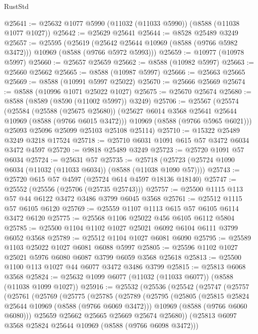\begin{lexlean}{RustStd}
\begin{coremodule}
@25641 := @25632 @1077 @5990 (@11032 (@11033 @5990)) (@8588 (@11038 @1077 @1027))
@25642 := @25629 @25641
@25644 := @8528 @25489 @3249
@25657 := @25595
    (@25619 (@25642 @25644 @10969 (@8588 (@9766 @5982 @3472))) @10969 (@8588 (@9766 @5972 @5993)))
@25659 := @10977 (@10978 @5997)
@25660 := @25657 @25659
@25662 := @8588 (@10982 @5997)
@25663 := @25660 @25662
@25665 := @8588 (@10987 @5997)
@25666 := @25663 @25665
@25669 := @8588 (@10991 @5997 @25022)
@25670 := @25666 @25669
@25674 := @8588 (@10996 @1071 @25022 @1027)
@25675 := @25670 @25674
@25680 := @8588 (@8589 (@8590 (@11002 @5997)) @3249)
@25706 := @25567
    (@25574
      (@25584
        (@25588 (@25675 @25680))
        (@25627 @6014 @3568 @25641 @25644 @10969 (@8588 (@9766 @6015 @3472)))
        @10969
        (@8588 (@9766 @5965 @6021)))
      @25093
      @25096
      @25099
      @25103
      @25108
      @25114)
@25710 := @15322 @25489 @3249 @3218 @17524
@25718 := @25710 @6031 @1091 @615 @57 @3472 @6034 @3472 @4597
@25720 := @9818 @25489 @3249
@25723 := @25720 @1091 @57 @6034
@25724 := @25631 @57
@25735 := @25718 (@25723 (@25724 @1090 @6034 (@11032 (@11033 @6034)) (@8588 (@11038 @1090 @57))))
@25743 := @25720 @615 @57 @4597 (@25724 @614 @4597 @18136 @18140)
@25747 := @25552 (@25556 (@25706 (@25735 @25743)))
@25757 := @25500 @1115 @113 @57 @44 @6122 @3472 @3486 @3799 @6045 @3568
@25761 := @25512 @1115 @57 @6105 @6120
@25769 := @25559 @1107 @1113 @615 @57 @6105 @6114 @3472 @6120
@25775 := @25568 @1106 @25022 @456 @6105 @6112 @5804
@25785 := @25500 @1104 @1102 @1027 @25021 @6092 @6104 @6111 @3799 @6052 @3568
@25789 := @25512 @1104 @1027 @6081 @6090
@25795 := @25589 @1103 @25022 @1027 @6081 @6088 @5997
@25805 := @25596 @1102 @1027 @25021 @5976 @6080 @6087 @3799 @6059 @3568 @25618
@25813 := @25500 @1100 @113 @1027 @44 @6077 @3472 @3486 @3799
@25815 := @25813 @6068 @3568
@25824 := @25632 @1099 @6077 (@11032 (@11033 @6077)) (@8588 (@11038 @1099 @1027))
@25916 := @25532
    (@25536
      (@25542
        (@25747
          (@25757
            (@25761
              (@25769
                (@25775
                  (@25785
                    (@25789
                      (@25795
                        (@25805
                          (@25815 @25824 @25644 @10969 (@8588 (@9766 @6069 @3472)))
                          @10969
                          (@8588 (@9766 @6060 @6080)))
                        @25659
                        @25662
                        @25665
                        @25669
                        @25674
                        @25680))
                    (@25813 @6097 @3568 @25824 @25644 @10969 (@8588 (@9766 @6098 @3472)))

\end{coremodule}
\end{lexlean}
